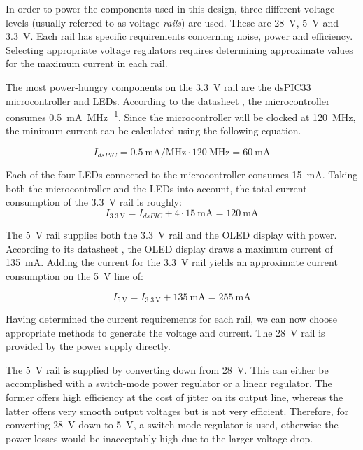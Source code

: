 \label{sec:voltage_rails}

In order to power the components  used in this design, three different voltage
levels  (usually referred  to  as voltage  \emph{rails})  are used. These  are
\SI{28}{\volt},  \SI{5}{\volt} and  \SI{3.3}{\volt}.  Each  rail has  specific
requirements concerning  noise, power  and efficiency.   Selecting appropriate
voltage  regulators requires  determining approximate  values for  the maximum
current in each rail.

The most power-hungry  components on the \SI{3.3}{\volt} rail  are the dsPIC33
microcontroller  and LEDs. According  to  the  datasheet ,
the microcontroller consumes \SI{0.5}{\milli\ampere\per\mega\hertz}. Since the
microcontroller will be clocked  at \SI{120}{\mega\hertz}, the minimum current
can be calculated using the following equation.

\begin{equation}
    I_{dsPIC} = \SI{0.5}{\milli\ampere\per\mega\hertz} \cdot \SI{120}{\mega\hertz} = \SI{60}{\milli\ampere}
\end{equation}

Each   of  the   four   LEDs  connected   to   the  microcontroller   consumes
\SI{15}{\milli\ampere}. Taking  both the  microcontroller  and  the LEDs  into
account, the total current consumption of the \SI{3.3}{\volt} rail is roughly:
\begin{equation}
    I_{\SI{3.3}{\volt}} = I_{dsPIC} + 4 \cdot \SI{15}{\milli\ampere} = \SI{120}{\milli\ampere}
\end{equation}

The \SI{5}{\volt}  rail supplies  both the \SI{3.3}{\volt}  rail and  the OLED
display with power. According  to its datasheet , the OLED
display draws a maximum current of \SI{135}{\milli\ampere}. Adding the current
for the \SI{3.3}{\volt} rail yields  an approximate current consumption on the
\SI{5}{\volt} line of:

\begin{equation}
    I_{\SI{5}{\volt}} = I_{\SI{3.3}{\volt}} + \SI{135}{\milli\ampere} = \SI{255}{\milli\ampere}
\end{equation}

Having determined  the current requirements for  each rail, we can  now choose
appropriate methods  to generate  the voltage and  current. The \SI{28}{\volt}
rail is provided by the power supply directly.

The    \SI{5}{\volt}   rail    is   supplied    by   converting    down   from
\SI{28}{\volt}. This  can  either be  accomplished  with  a switch-mode  power
regulator or a linear regulator. The former offers high efficiency at the cost
of jitter  on its output  line, whereas the  latter offers very  smooth output
voltages but  is not very efficient. Therefore,  for converting \SI{28}{\volt}
down to  \SI{5}{\volt}, a switch-mode  regulator is used, otherwise  the power
losses would be inacceptably high due to the larger voltage drop.

